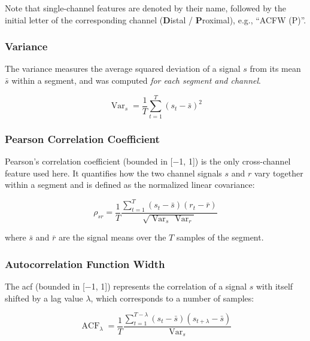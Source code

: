 Note that single-channel features are denoted by their name, followed by the initial letter of the corresponding channel (\textbf{D}istal / \textbf{P}roximal), e.g., \enquote{ACFW (P)}.

\subsubsection{Variance}
The variance measures the average squared deviation of a signal $s$ from its mean $\bar{s}$ within a segment, and was computed \textit{for each segment and channel}.

\begin{equation}
    \label{eq:variance}
    \operatorname{Var}_s = \frac{1}{T} \sum_{t=1}^{T} \left(s_t-\bar{s}\right)^2
\end{equation}

\subsubsection{Pearson Correlation Coefficient}
Pearson's correlation coefficient (bounded in [\num{-1}, \num{1}]) is the only cross-channel feature used here.
It quantifies how the two channel signals $s$ and $r$ vary together within a segment and is defined as the normalized linear covariance:

\begin{equation}
    \label{eq:pearson-correlation}
    \rho_{sr} =
    \frac{1}{T}
    \frac{\sum_{t=1}^{T} \left(s_t-\bar{s}\right)\left(r_t-\bar{r}\right)}{\sqrt{\operatorname{Var}_s\,\operatorname{Var}_r}}
\end{equation}

where $\bar{s}$ and $\bar{r}$ are the signal means over the $T$ samples of the segment.

\subsubsection{Autocorrelation Function Width}
The \gls{acf} (bounded in [\num{-1}, \num{1}]) represents the correlation of a signal $s$ with itself shifted by a lag value $\lambda$, which corresponds to a number of samples:

\begin{equation}
    \label{eq:acf}
    \operatorname{ACF}_\lambda =
    \frac{1}{T} \frac    {\sum_{t=1}^{T-\lambda}\left(s_t-\bar{s}\right)\left(s_{t+\lambda}-\bar{s}\right)}{\operatorname{Var}_s}
\end{equation}

